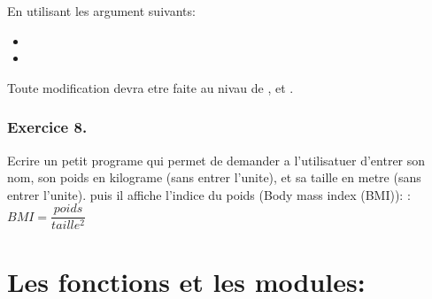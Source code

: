 \documentclass[letterpaper,10pt,french]{sphinxmanual}
\begin{document}
\begin{sphinxVerbatim}[commandchars=\\\{\}]
     
\end{sphinxVerbatim}

\sphinxAtStartPar
En utilisant les argument suivants:
\begin{itemize}
\item {} 
\sphinxAtStartPar
{}

\item {} 
\sphinxAtStartPar
{}

\end{itemize}

\sphinxAtStartPar
Toute modification devra etre faite au nivau de , et .

\begin{sphinxVerbatim}[commandchars=\\\{\}]
\end{sphinxVerbatim}




\subsection{Exercice 8.}
\label{\detokenize{exo3:exercice-8}}
\sphinxAtStartPar
Ecrire un petit programe qui permet de demander a l’utilisatuer d’entrer son nom, son poids en kilograme (sans entrer l’unite), et sa taille en metre (sans entrer l’unite). puis il affiche l’indice du poids (Body mass index (BMI)):
: \(BMI = \dfrac{poids}{taille^2}\)

\begin{sphinxVerbatim}[commandchars=\\\{\}]
\end{sphinxVerbatim}


\chapter{Les fonctions et les modules:}
\label{\detokenize{content4:les-fonctions-et-les-modules}}\label{\detokenize{content4::doc}}
\end{document}

